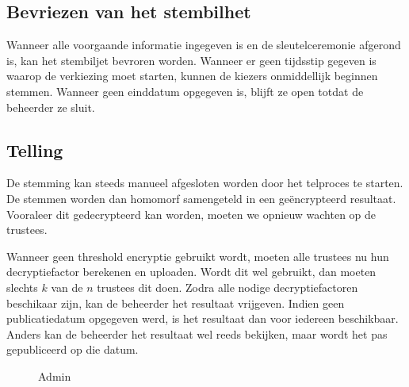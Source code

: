 \subsection{Bevriezen van het stembilhet}

Wanneer alle voorgaande informatie ingegeven is en de sleutelceremonie afgerond is, kan het stembiljet bevroren worden. Wanneer er geen tijdsstip gegeven is waarop de verkiezing moet starten, kunnen de kiezers onmiddellijk beginnen stemmen. Wanneer geen einddatum opgegeven is, blijft ze open totdat de beheerder ze sluit.

\subsection{Telling}


De stemming kan steeds manueel afgesloten worden door het telproces te starten. De stemmen worden dan homomorf samengeteld in een geëncrypteerd resultaat. Vooraleer dit gedecrypteerd kan worden, moeten we opnieuw wachten op de trustees.

\npar Wanneer geen threshold encryptie gebruikt wordt, moeten alle trustees nu hun decryptiefactor berekenen en uploaden. Wordt dit wel gebruikt, dan moeten slechts $k$ van de $n$ trustees dit doen. Zodra alle nodige decryptiefactoren beschikaar zijn, kan de beheerder het resultaat vrijgeven. Indien geen publicatiedatum opgegeven werd, is het resultaat dan voor iedereen beschikbaar. Anders kan de beheerder het resultaat wel reeds bekijken, maar wordt het pas gepubliceerd op die datum.

\begin{figure}
  \caption{Admin}
  \label{fig:proc:elections_admin}
\end{figure}
